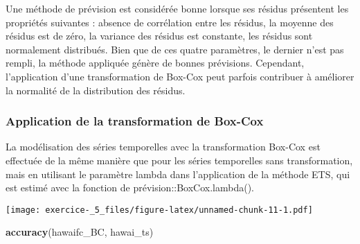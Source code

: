 \documentclass[
]{article}
\newenvironment{Shaded}{\begin{snugshade}}{\end{snugshade}}
\newcommand{\DataTypeTok}[1]{\textcolor[rgb]{0.13,0.29,0.53}{#1}}
\newcommand{\KeywordTok}[1]{\textcolor[rgb]{0.13,0.29,0.53}{\textbf{#1}}}
\newcommand{\NormalTok}[1]{#1}
\newcommand{\OperatorTok}[1]{\textcolor[rgb]{0.81,0.36,0.00}{\textbf{#1}}}
\newcommand{\StringTok}[1]{\textcolor[rgb]{0.31,0.60,0.02}{#1}}
\begin{document}
Une méthode de prévision est considérée bonne lorsque ses résidus
présentent les propriétés suivantes : absence de corrélation entre les
résidus, la moyenne des résidus est de zéro, la variance des résidus est
constante, les résidus sont normalement distribués. Bien que de ces
quatre paramètres, le dernier n'est pas rempli, la méthode appliquée
génère de bonnes prévisions. Cependant, l'application d'une
transformation de Box-Cox peut parfois contribuer à améliorer la
normalité de la distribution des résidus.

\hypertarget{application-de-la-transformation-de-box-cox}{%
\subsubsection{Application de la transformation de
Box-Cox}\label{application-de-la-transformation-de-box-cox}}

La modélisation des séries temporelles avec la transformation Box-Cox
est effectuée de la même manière que pour les séries temporelles sans
transformation, mais en utilisant le paramètre lambda dans l'application
de la méthode ETS, qui est estimé avec la fonction de
prévision::BoxCox.lambda().

\begin{Shaded}
\end{Shaded}

\texttt{[image: exercice-\_5\_files/figure-latex/unnamed-chunk-11-1.pdf]}

\begin{Shaded}
\begin{Highlighting}[]
\KeywordTok{accuracy}\NormalTok{(hawaifc_BC, hawai_ts)}
\end{Highlighting}
\end{Shaded}
\end{document}
